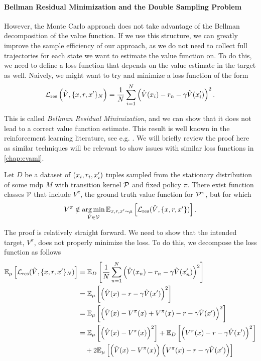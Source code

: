 \paragraph{Bellman Residual Minimization and the Double Sampling Problem}
However, the Monte Carlo approach does not take advantage of the Bellman decomposition of the value function.
If we use this structure, we can greatly improve the sample efficiency of our approach, as we do not need to collect full trajectories for each state we want to estimate the value function on.
To do this, we need to define a loss function that depends on the value estimate in the target as well.
Naively, we might want to try and minimize a loss function of the form
$$\mathcal{L}_\mathrm{res}\left(\hat{V}, \{\state, r, \state'\}_{N}\right) = \frac{1}{N} \sum_{i=1}^N \left(\hat{V}(\state_i) - r_n - \gamma \hat{V}(\state'_i)\right)^2.$$

This is called \emph{Bellman Residual Minimization}, and we can show that it does not lead to a correct value function estimate.
This result is well known in the reinforcement learning literature, see e.g. \textcite[p. 299]{suttonbook}.
We will briefly review the proof here as similar techniques will be relevant to show issues with similar loss functions in \autoref{chap:cvaml}.


\begin{proposition}
    Let $D$ be a dataset of $(\state_i,r_i,\state'_i)$ tuples sampled from the stationary distribution of some \ac{mdp}  $M$ with transition kernel $\P$ and fixed policy $\pi$.
    There exist function classes $\mathcal{V}$ that include $V^\pi$, the ground truth value function for $\P^\pi$, but for which 
    \[V^\pi \notin \argmin_{\hat{V} \in \mathcal{V}} \mathbb{E}_{x,r,x' \sim \mu} \left[\mathcal{L}_\mathrm{res}(\hat{V}, \{\state, r, \state'\})\right].\]
\end{proposition}

The proof is relatively straight forward.
We need to show that the intended target, $V^\pi$, does not properly minimize the loss.
To do this, we decompose the loss function as follows
\begin{align}
    \mathbb{E}_{\mu} \left[\mathcal{L}_\mathrm{res}(\hat{V}, \{\state, r, \state'\}_N)\right] &= \mathbb{E}_{D} \left[\frac{1}{N} \sum_{n=1}^N \left(\hat{V}(\state_n) - r_n - \gamma \hat{V}(\state'_n)\right)^2\right] \\
    &=\mathbb{E}_{\mu} \left[\left(\hat{V}(x) - r - \gamma \hat{V}(x')\right)^2\right] \\
    &=\mathbb{E}_{\mu} \left[\left(\hat{V}(x) - V^\pi(x) + V^\pi(x) - r - \gamma \hat{V}(x')\right)^2\right] \\
    &=\mathbb{E}_{\mu} \left[\left(\hat{V}(x) - V^\pi(x)\right)^2\right] + \mathbb{E}_{D}\left[\left( V^\pi(x) - r - \gamma \hat{V}(x')\right)^2\right] \\
    &\quad + 2 \mathbb{E}_{\mu}\left[\left(\hat{V}(x) - V^\pi(x)\right)\left( V^\pi(x) - r - \gamma \hat{V}(x')\right)\right]
\end{align}

